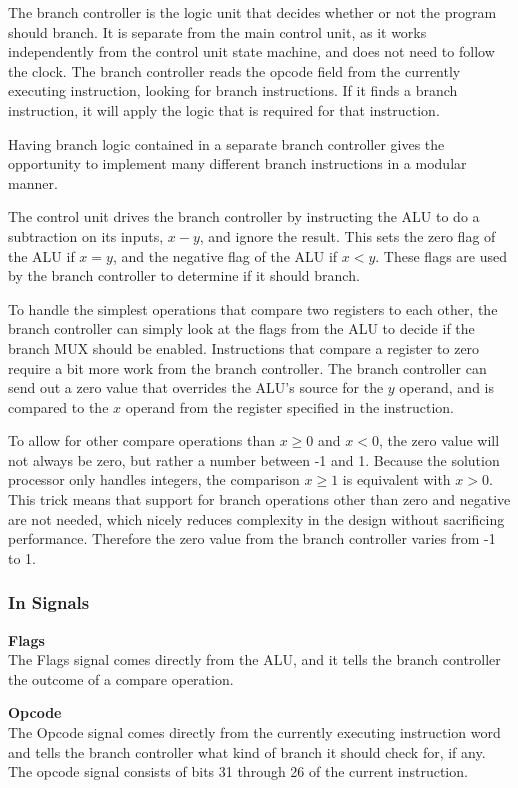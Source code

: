 The branch controller is the logic unit that decides whether or not the program should branch.
It is separate from the main control unit, as it works independently from the control unit state machine, and does not need to follow the clock.
The branch controller reads the opcode field from the currently executing instruction, looking for branch instructions.
If it finds a branch instruction, it will apply the logic that is required for that instruction.

Having branch logic contained in a separate branch controller gives the opportunity to implement many different branch instructions in a modular manner.

The control unit drives the branch controller by instructing the ALU to do a subtraction on its inputs, $ x - y $, and ignore the result.
This sets the zero flag of the ALU if $x = y$, and the negative flag of the ALU if $x < y$.
These flags are used by the branch controller to determine if it should branch.

To handle the simplest operations that compare two registers to each other, the branch controller can simply look at the flags from the ALU to decide if the branch MUX should be enabled.
Instructions that compare a register to zero require a bit more work from the branch controller.
The branch controller can send out a zero value that overrides the ALU's source for the $ y $ operand, and is compared to the $ x $ operand from the register specified in the instruction.

To allow for other compare operations than $x \geq 0$ and $x < 0$, the zero value will not always be zero, but rather a number between -1 and 1. 
Because the solution processor only handles integers, the comparison $ x \geq 1 $ is equivalent with $ x > 0 $.
This trick means that support for branch operations other than zero and negative are not needed, which nicely reduces complexity in the design without sacrificing performance.
Therefore the zero value from the branch controller varies from -1 to 1.

\subsubsection{In Signals}

\begin{description}
\item{\textbf{Flags}} \\
The Flags signal comes directly from the ALU, and it tells the branch controller the outcome of a compare operation.

\item{\textbf{Opcode}} \\
The Opcode signal comes directly from the currently executing instruction word and tells the branch controller what kind of branch it should check for, if any. The opcode signal consists of bits 31 through 26 of the current instruction.

\end{description}

